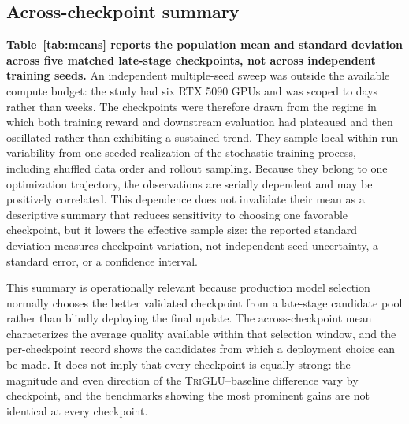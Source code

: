 \documentclass[10pt]{article}
\newcommand{\TriGLU}{\textsc{TriGLU}}
\begin{document}
\subsection{Across-checkpoint summary}

\textbf{Table~\ref{tab:means} reports the population mean and standard
deviation across five matched late-stage checkpoints, not across independent
training seeds.}  An independent multiple-seed sweep was outside the available
compute budget: the study had six RTX 5090 GPUs and was scoped to days rather
than weeks.  The checkpoints were therefore drawn from the regime in which both
training reward and downstream evaluation had plateaued and then oscillated
rather than exhibiting a sustained trend.  They sample local within-run
variability from one seeded realization of the stochastic training process,
including shuffled data order and rollout sampling.  Because they belong to one
optimization trajectory, the observations are serially dependent and may be
positively correlated.  This dependence does not invalidate their mean as a
descriptive summary that reduces sensitivity to choosing one favorable
checkpoint, but it lowers the effective sample size: the reported standard
deviation measures checkpoint variation, not independent-seed uncertainty, a
standard error, or a confidence interval.

This summary is operationally relevant because production model selection
normally chooses the better validated checkpoint from a late-stage candidate
pool rather than blindly deploying the final update.  The across-checkpoint
mean characterizes the average quality available within that selection window,
and the per-checkpoint record shows the candidates from which a deployment
choice can be made.  It does not imply that every checkpoint is equally strong:
the magnitude and even direction of the \TriGLU{}--baseline difference vary by
checkpoint, and the benchmarks showing the most prominent gains are not
identical at every checkpoint.
\end{document}
